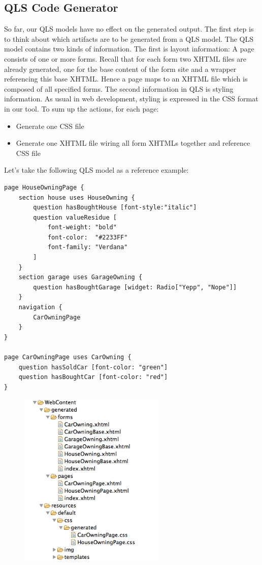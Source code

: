 \subsection{QLS Code Generator} \label{sec:QLSGenerator}

So far, our QLS models have no effect on the generated output. The first step
is to think about which artifacts are to be generated from a QLS model. The QLS
model contains two kinds of information. The first is layout information: A page
consists of one or more forms. Recall that for each form two XHTML files are
already generated, one for the base content of the form site and a wrapper
referencing this base XHTML. Hence a page maps to an XHTML file which is
composed of all specified forms. The second information in QLS is styling
information. As usual in web development, styling is expressed in the CSS format
in our tool. To sum up the actions, for each page:

\begin{itemize}
  \item Generate one CSS file
  \item Generate one XHTML file wiring all form XHTMLs together and reference
  CSS file
\end{itemize}

Let's take the following QLS model as a reference example:
\begin{lstlisting}[language=QLS]
page HouseOwningPage {
	section house uses HouseOwning {
		question hasBoughtHouse [font-style:"italic"]
		question valueResidue [
			font-weight: "bold" 
			font-color:  "#2233FF"
			font-family: "Verdana"
		]
	}
	section garage uses GarageOwning {
		question hasBoughtGarage [widget: Radio["Yepp", "Nope"]]		
	}
	navigation {
		CarOwningPage
	}
}

page CarOwningPage uses CarOwning {
	question hasSoldCar [font-color: "green"]
	question hasBoughtCar [font-color: "red"]
}
\end{lstlisting}


\begin{figure}
\includegraphics[width=7cm]{./images/chapter03/referenceimpl_projecttree_qls.png}
\end{figure}

